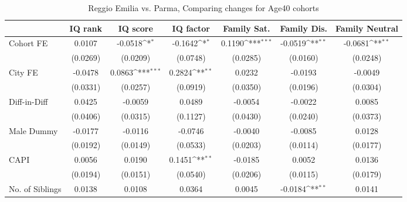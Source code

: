 \begin{table}[htbp]\centering
\def\sym#1{\ifmmode^{#1}\else\(^{#1}\)\fi}
\caption{Reggio Emilia vs. Parma, Comparing changes for Age40 cohorts}
\begin{tabular}{l*{6}{c}}
\toprule
            &\multicolumn{1}{c}{IQ rank}&\multicolumn{1}{c}{IQ score}&\multicolumn{1}{c}{IQ factor}&\multicolumn{1}{c}{Family Sat.}&\multicolumn{1}{c}{Family Dis.}&\multicolumn{1}{c}{Family Neutral}\\
\midrule
Cohort FE   &      0.0107         &     -0.0518\sym{*}  &     -0.1642\sym{*}  &      0.1190\sym{***}&     -0.0519\sym{**} &     -0.0681\sym{**} \\
            &    (0.0269)         &    (0.0209)         &    (0.0748)         &    (0.0285)         &    (0.0160)         &    (0.0248)         \\
\addlinespace
City FE     &     -0.0478         &      0.0863\sym{***}&      0.2824\sym{**} &      0.0232         &     -0.0193         &     -0.0049         \\
            &    (0.0331)         &    (0.0257)         &    (0.0919)         &    (0.0350)         &    (0.0196)         &    (0.0304)         \\
\addlinespace
Diff-in-Diff&      0.0425         &     -0.0059         &      0.0489         &     -0.0054         &     -0.0022         &      0.0085         \\
            &    (0.0406)         &    (0.0315)         &    (0.1127)         &    (0.0430)         &    (0.0240)         &    (0.0373)         \\
\addlinespace
Male Dummy  &     -0.0177         &     -0.0116         &     -0.0746         &     -0.0040         &     -0.0085         &      0.0128         \\
            &    (0.0192)         &    (0.0149)         &    (0.0533)         &    (0.0203)         &    (0.0114)         &    (0.0177)         \\
\addlinespace
CAPI        &      0.0056         &      0.0190         &      0.1451\sym{**} &     -0.0185         &      0.0052         &      0.0136         \\
            &    (0.0194)         &    (0.0151)         &    (0.0540)         &    (0.0206)         &    (0.0115)         &    (0.0179)         \\
\addlinespace
No. of Siblings&      0.0138         &      0.0108         &      0.0364         &      0.0045         &     -0.0184\sym{**} &      0.0141         \\

\end{tabular}
\end{table}

